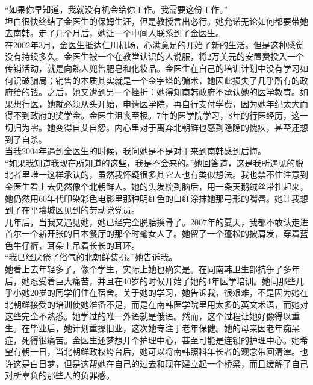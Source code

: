 “如果你早知道，我就没有机会给你工作。我需要这份工作。”\\

坦白很快终结了金医生的保姆生涯，但是教授言出必行。她允诺无论如何都要带她去南韩。走了几个月后，她让一个中间人联系到了金医生。\\

在2002年3月，金医生抵达仁川机场，心满意足的开始了新的生活。但是这种感觉没有持续多久。金医生被一个在教堂认识的人说服，将2万美元的安置费投入一个传销活动，就是向熟人兜售肥皂和化妆品。金医生在自己的培训计划中没有学习如何识破骗局；销售的本质其实就是一个金字塔的骗术，她因此损失了几乎所有的政府给的钱。之后，她又遭到另一个挫折：她得知南韩政府不承认她的医学教育。如果想行医，她就必须从头开始，申请医学院，再自行支付学费，因为她年纪太大而得不到政府的奖学金。金医生沮丧至极。7年的医学院学习，8年的行医经历，这一切归为零。她变得自艾自怨。内心里对于离弃北朝鲜也感到隐隐的愧疚，甚至还想到了自杀。\\

当我2004年遇到金医生的时候，我问她是不是对于来到南韩感到后悔。\\

“如果我知道我现在所知道的这些，我是不会来的。”她回答道，这是我所遇见的脱北者里唯一这样承认的，虽然我怀疑很多其它人也有类似想法。我也禁不住注意到金医生看上去仍然像个北朝鲜人。她的头发梳到脑后，用一条天鹅绒丝带扎起来，她仍然用60年代印染彩色电影里那种明红色的口红涂抹她那弓形的嘴唇。她让我想到了在平壤城区见到的劳动党党员。\\

几年后，当我又遇见她，她已经完全脱胎换骨了。2007年的夏天，我都不敢认走进首尔一个新开张的日本餐厅的那个时髦女人了。她留了一个蓬松的披肩发，穿着蓝色牛仔裤，耳朵上吊着长长的耳环。\\

“我已经厌倦了俗气的北朝鲜装扮。”她告诉我。\\

她看上去年轻多了，像个学生，实际上她也确实是。在同南韩卫生部抗争了多年后，她忍受着巨大痛苦，并且在40岁的时候开始了她的4年医学培训。她同那些几乎小她20岁的同学们住在宿舍。关于她的学习，她告诉我，很艰难，不是因为她在北朝鲜接受的培训使她准备不足，而是在南韩医学院里用太多的英文术语，而她对这些完全不熟悉。她学过的唯一外语就是俄语。然而，这个过程让她好像得以重生。在毕业后，她计划重操旧业，这次她专注于老年保健。她的母亲因老年痴呆症，死得很痛苦。金医生还梦想开个护理中心，甚至可能是连锁的护理中心。她希望有朝一日，当北朝鲜政权垮台后，她可以将南韩照料年长者的观念带回清津。也许这是白日梦，但是这帮她在自己的过去和现在建立起一个桥梁，而且缓解了自己对所辜负的那些人的负罪感。\\

